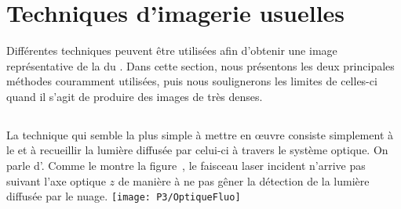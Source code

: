 \casse

\section{Techniques d'imagerie usuelles}\label{sec:ImagerieUsuelles}
Différentes techniques peuvent être utilisées afin d'obtenir une image représentative de la \dat du \n. Dans cette section, nous présentons les deux principales méthodes couramment utilisées, puis nous soulignerons les limites de celles-ci quand il s'agit de produire des images de \ns très denses.


\subsection{\Ipf}\label{sec:ipf}
La technique qui semble la plus simple à mettre en \oe uvre consiste simplement à  le \nat et à recueillir la lumière diffusée par celui-ci à travers le système optique. On parle d'\emph{\ipf}.
Comme le montre la figure~, le faisceau laser incident n'arrive pas suivant l'axe optique $z$ de manière à ne pas gêner la détection de la lumière diffusée par le nuage.
\bfigh
\texttt{[image: P3/OptiqueFluo]}
\label{fig:OptiqueFluo}
\efigh

